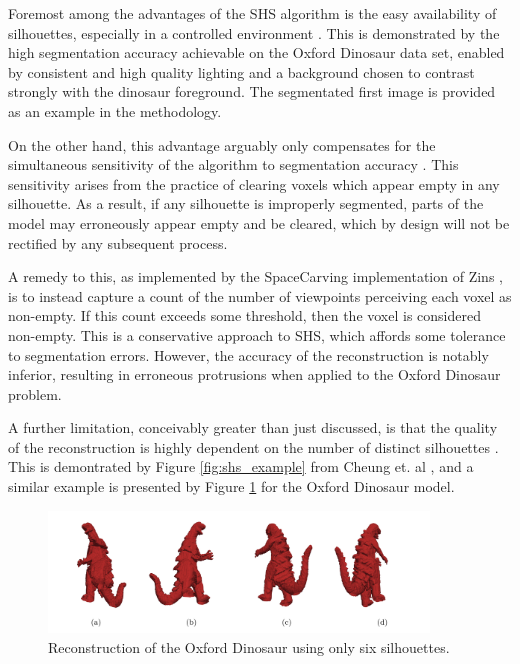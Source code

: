 Foremost among the advantages of the SHS algorithm is the easy availability of silhouettes, especially in a controlled environment \cite{cheung_2005}. This is demonstrated by the high segmentation accuracy achievable on the Oxford Dinosaur data set, enabled by consistent and high quality lighting and a background chosen to contrast strongly with the dinosaur foreground. The segmentated first image is provided as an example in the methodology.

On the other hand, this advantage arguably only compensates for the simultaneous sensitivity of the algorithm to segmentation accuracy \cite{lovell_2023b}. This sensitivity arises from the practice of clearing voxels which appear empty in any silhouette. As a result, if any silhouette is improperly segmented, parts of the model may erroneously appear empty and be cleared, which by design will not be rectified by any subsequent process.

A remedy to this, as implemented by the SpaceCarving implementation of Zins \cite{zins_2019}, is to instead capture a count of the number of viewpoints perceiving each voxel as non-empty. If this count exceeds some threshold, then the voxel is considered non-empty. This is a conservative approach to SHS, which affords some tolerance to segmentation errors. However, the accuracy of the reconstruction is notably inferior, resulting in erroneous protrusions when applied to the Oxford Dinosaur problem.

A further limitation, conceivably greater than just discussed, is that the quality of the reconstruction is highly dependent on the number of distinct silhouettes \cite{cheung_2005}. This is demontrated by Figure \ref{fig:shs_example} from Cheung et. al \cite{cheung_2005}, and a similar example is presented by Figure \ref{fig:bad_reconstruction} for the Oxford Dinosaur model.

\begin{figure}[ht]
  \centering
  \includegraphics[width=0.9\textwidth]{images/q2_bad_reconstruction.png}
  \caption{Reconstruction of the Oxford Dinosaur using only six silhouettes.}
  \label{fig:bad_reconstruction}
\end{figure}

